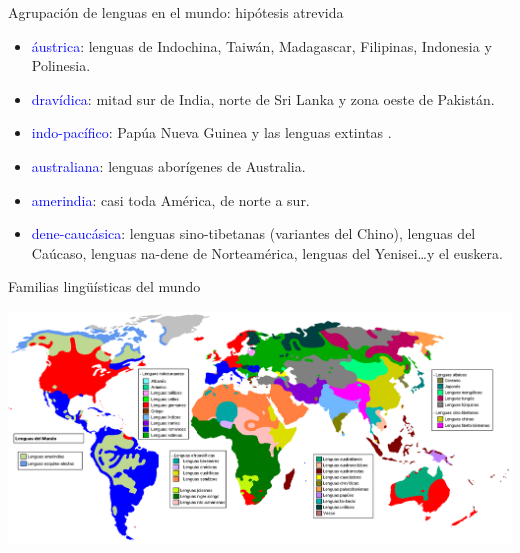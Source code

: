 \documentclass[handout]{beamer}
\begin{document}
\begin{frame}{Agrupación de lenguas en el mundo: hipótesis atrevida}
\begin{itemize}
	\item \textcolor{blue}{áustrica}: lenguas de Indochina, Taiwán, Madagascar, Filipinas, Indonesia y Polinesia.
	\item \textcolor{blue}{dravídica}: mitad sur de India, norte de Sri Lanka y zona oeste de Pakistán.
	\item \textcolor{blue}{indo-pacífico}: Papúa Nueva Guinea y las lenguas extintas .
	\item \textcolor{blue}{australiana}: lenguas aborígenes de Australia.
	\item \textcolor{blue}{amerindia}: casi toda América, de norte a sur.
	\item \textcolor{blue}{dene-caucásica}: lenguas sino-tibetanas (variantes del Chino), lenguas del Caúcaso, lenguas na-dene de Norteamérica, lenguas del Yenisei\ldots y el euskera.
\end{itemize}
\end{frame}

\begin{frame}{Familias lingüísticas del mundo}
\begin{center} 
  \includegraphics[scale=0.25]{img/lenguas-mundo.png} 
\end{center}

\end{frame}
\end{document}
